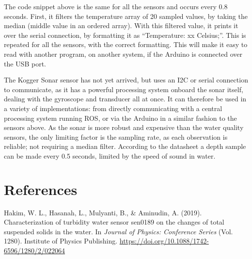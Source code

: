 \documentclass[
  english,
  man,floatsintext]{apa6}
\begin{document}
The code snippet above is the same for all the sensors and occurs every 0.8 seconds. First, it filters the temperature array of 20 sampled values, by taking the median (middle value in an ordered array). With this filtered value, it prints it over the serial connection, by formatting it as \enquote{Temperature: xx Celsius;}. This is repeated for all the sensors, with the correct formatting. This will make it easy to read with another program, on another system, if the Arduino is connected over the USB port.

The Kogger Sonar sensor has not yet arrived, but uses an I2C or serial connection to communicate, as it has a powerful processing system onboard the sonar itself, dealing with the gyroscope and transducer all at once. It can therefore be used in a variety of implementations: from directly communicating with a central processing system running ROS, or via the Arduino in a similar fashion to the sensors above. As the sonar is more robust and expensive than the water quality sensors, the only limiting factor is the sampling rate, as each observation is reliable; not requiring a median filter. According to the datasheet a depth sample can be made every 0.5 seconds, limited by the speed of sound in water.

\newpage

\hypertarget{references}{%
\section{References}\label{references}}

\begingroup
\setlength{\parindent}{-0.5in}
\setlength{\leftskip}{0.5in}

\hypertarget{refs}{}
\leavevmode\hypertarget{ref-Hakim2019}{}%
Hakim, W. L., Hasanah, L., Mulyanti, B., \& Aminudin, A. (2019). Characterization of turbidity water sensor sen0189 on the changes of total suspended solids in the water. In \emph{Journal of Physics: Conference Series} (Vol. 1280). Institute of Physics Publishing. \url{https://doi.org/10.1088/1742-6596/1280/2/022064}

\endgroup


\clearpage
\renewcommand{\listfigurename}{Figure captions}

\clearpage
\renewcommand{\listtablename}{Table captions}
\end{document}
